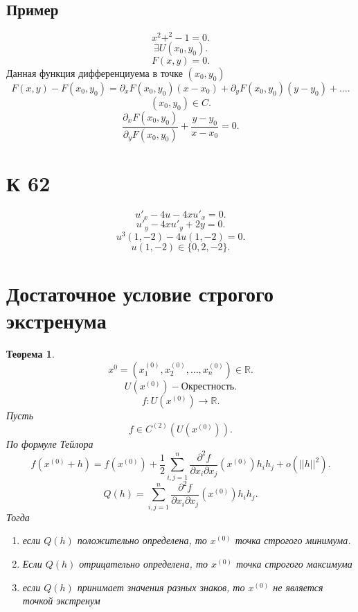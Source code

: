 \documentclass[14pt]{extarticle} \usepackage{fontspec}
\newtheorem{theorem}{Теорема}
\begin{document}
\subsection {Пример}
\[
x^2 + ^2 - 1 = 0
.\] 
\[
\exists U(x_0,y_0)
.\] 
\[
F(x,y) = 0
.\] 
Данная функция дифференциуема в точке $(x_0,y_0)$
\[
F(x,y) - F(x_0,y_0) = \partial_{x} F(x_0,y_0) (x-x_0) + \partial_{y} F(x_0,y_0)(y - y_0) + \dots
.\] 
\[
    (x_0,y_0) \in C
.\] 
\[
\frac{\partial_{x} F(x_0,y_0)}{\partial_{y} F(x_0,y_0)} + \frac{y - y_0}{x - x_0} = 0
.\] 
\section{К 62}
\[
 u'_{x} - 4u - 4xu'_{x} = 0
.\] 
\[
 u'_{y} - 4x u'_{y} + 2y = 0
.\] 
\[
u^{3}(1,-2) - 4u(1,-2) = 0
.\] 
\[
    u(1,-2) \in \{0,2,-2\}
.\] 
\section{Достаточное условие строгого экстренума}
\begin{theorem}
    \[
        x^{0} = (x_1^{(0)},x_2^{(0)},\dots,x^{(0)}_{n}) \in \mathbb{R}
    .\] 
    \[
        U(x^{(0)}) - \text{Окрестность}
    .\] 
    \[
    f: U(x^{(0)}) \to \mathbb{R}
    .\] 
    Пусть
    \[
    f \in C^{(2)} (U(x^{(0)}))
    .\] 
    По формуле Тейлора
    \[
        f(x^{(0)} + h) = f(x^{(0)}) + \frac{1}{2} \sum_{i,j = 1}^{n} \frac{\partial^2 f}{\partial x_{i} \partial x_{j}} (x^{(0)}) h_{i} h_{j} + o(||h||^2)
    .\] 
    \[
    Q(h) = \sum_{i,j = 1}^{n} \frac{\partial^2 f}{\partial x_{i} \partial x_{j}} (x^{(0)}) h_{i} h_{j}
    .\] 
    Тогда 
    \begin{enumerate}
        \item  если $Q(h)$ положительно определена, то  $x^{(0)}$ точка строгого минимума.
        \item Если $Q(h)$ отрицательно определена, то  $x^{(0)}$ точка строгого максимума
        \item если $Q(h)$ принимает значения разных знаков, то  $x^{(0)}$ не является точкой экстренум
    \end{enumerate}
\end{theorem}
\end{document}
